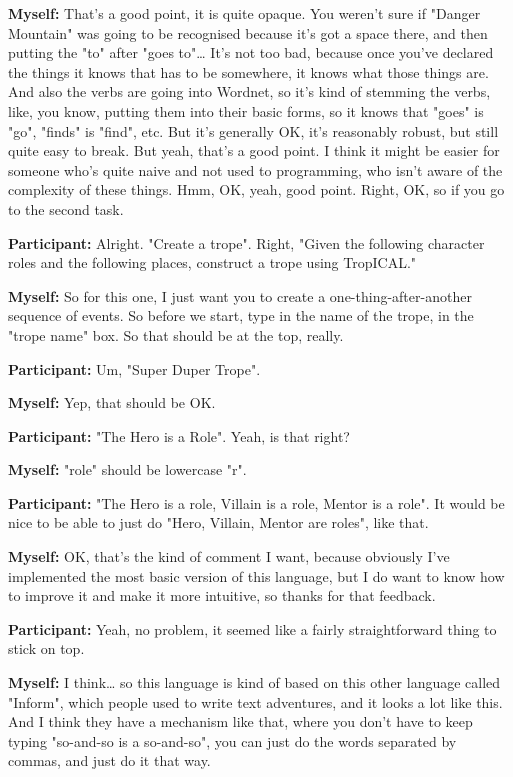 \documentclass[11pt]{report}
\begin{document}
\begin{linenumbers}
\textbf{Myself:} That's a good point, it is quite opaque. You weren't sure if "Danger Mountain" was going to be recognised because it's got a space there, and then putting the "to" after "goes to"\ldots{} It's not too bad, because once you've declared the things it knows that has to be somewhere, it knows what those things are. And also the verbs are going into Wordnet, so it's kind of stemming the verbs, like, you know, putting them into their basic forms, so it knows that "goes" is "go", "finds" is "find", etc. But it's generally OK, it's reasonably robust, but still quite easy to break. But yeah, that's a good point. I think it might be easier for someone who's quite naive and not used to programming, who isn't aware of the complexity of these things. Hmm, OK, yeah, good point. Right, OK, so if you go to the second task.

\textbf{Participant:} Alright. "Create a trope". Right, "Given the following character roles and the following places, construct a trope using TropICAL."

\textbf{Myself:} So for this one, I just want you to create a one-thing-after-another sequence of events. So before we start, type in the name of the trope, in the "trope name" box. So that should be at the top, really.

\textbf{Participant:} Um, "Super Duper Trope".

\textbf{Myself:} Yep, that should be OK.

\textbf{Participant:} "The Hero is a Role". Yeah, is that right?

\textbf{Myself:} "role" should be lowercase "r".

\textbf{Participant:} "The Hero is a role, Villain is a role, Mentor is a role". It would be nice to be able to just do "Hero, Villain, Mentor are roles", like that.

\textbf{Myself:} OK, that's the kind of comment I want, because obviously I've implemented the most basic version of this language, but I do want to know how to improve it and make it more intuitive, so thanks for that feedback.

\textbf{Participant:} Yeah, no problem, it seemed like a fairly straightforward thing to stick on top.

\textbf{Myself:} I think\ldots{} so this language is kind of based on this other language called "Inform", which people used to write text adventures, and it looks a lot like this. And I think they have a mechanism like that, where you don't have to keep typing "so-and-so is a so-and-so", you can just do the words separated by commas, and just do it that way.


\end{linenumbers}
\end{document}
